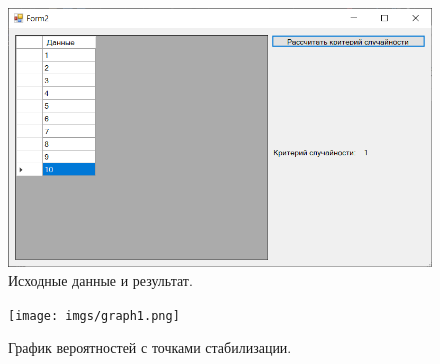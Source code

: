 \documentclass[12pt]{report}
\begin{document}
\begin{figure}[H]
	\begin{center}
		\includegraphics[scale=0.6]{imgs/res1.png}
	\end{center}
	\caption{Исходные данные и результат.}
	\label{img:res1}
\end{figure}

\begin{figure}[H]
	\begin{center}
		\texttt{[image: imgs/graph1.png]}
	\end{center}
	\caption{График вероятностей с точками стабилизации.}
	\label{img:graph1}
\end{figure}
\end{document}
